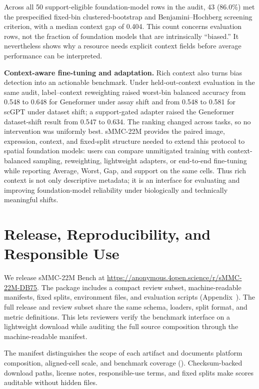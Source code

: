\documentclass[sigconf,review]{acmart}
\newcommand{\dataset}{sMMC-22M\xspace}
\begin{document}
Across all 50 support-eligible foundation-model rows in the audit, 43
(86.0\%) met the prespecified fixed-bin clustered-bootstrap and
Benjamini--Hochberg screening criterion, with a median context gap of 0.404.
This count concerns evaluation rows, not the fraction of foundation models
that are intrinsically ``biased.'' It nevertheless shows why a resource needs
explicit context fields before average performance can be interpreted.

\noindent\textbf{Context-aware fine-tuning and adaptation.}
Rich context also turns bias detection into an actionable benchmark. Under
held-out-context evaluation in the same audit, label--context
reweighting raised worst-bin balanced accuracy from 0.548 to 0.648 for
Geneformer under assay shift and from 0.548 to 0.581 for scGPT under dataset
shift; a support-gated adapter raised the Geneformer dataset-shift result from
0.547 to 0.634. The ranking changed across tasks, so no intervention was
uniformly best. \dataset provides the paired image, expression, context, and
fixed-split structure needed to extend this protocol to spatial foundation
models: users can compare unmitigated training with context-balanced sampling,
reweighting, lightweight adapters, or end-to-end fine-tuning while reporting
Average, Worst, Gap, and support on the same cells. Thus rich context is not
only descriptive metadata; it is an interface for evaluating and improving
foundation-model reliability under biologically and technically meaningful
shifts.

\section{Release, Reproducibility, and Responsible Use}
\label{sec:release_reproducibility}

We release \dataset Bench at
\url{https://anonymous.4open.science/r/sMMC-22M-DB75}. The package includes a
compact review subset, machine-readable manifests, fixed splits, environment
files, and evaluation scripts (Appendix~).
The full release and review subset share the same schema, loaders, split
format, and metric definitions. This lets reviewers verify the benchmark
interface on a lightweight download while auditing the full source composition
through the machine-readable manifest.

The manifest distinguishes the scope of each artifact and documents platform
composition, aligned-cell scale, and benchmark coverage
(). Checksum-backed download paths, license
notes, responsible-use terms, and fixed splits make scores auditable
without hidden files.
\end{document}
